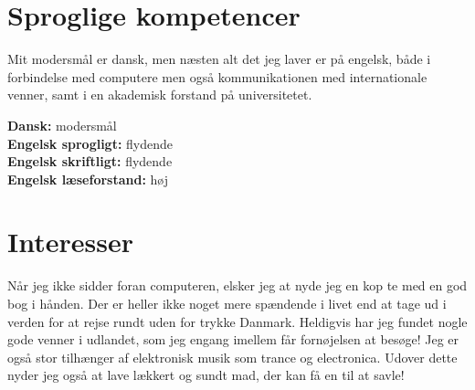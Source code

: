 \documentclass[margin,line,a4paper]{resume}
\begin{document}
\begin{resume}
\begin{description}
\end{description}

\section{\mysidestyle Sproglige kompetencer}
Mit modersmål er dansk, men næsten alt det jeg laver er på engelsk,
både i forbindelse med computere men også kommunikationen med
internationale venner, samt i en akademisk forstand på universitetet.

\textbf{Dansk:} modersmål \\
\textbf{Engelsk sprogligt:} flydende \\
\textbf{Engelsk skriftligt:} flydende \\
\textbf{Engelsk læseforstand:} høj \\

\section{\mysidestyle Interesser}

Når jeg ikke sidder foran computeren, elsker jeg at nyde jeg en kop 
te med en god bog i hånden. Der er heller ikke noget
mere spændende i livet end at tage ud i verden for at rejse rundt uden
for trykke Danmark. Heldigvis har jeg fundet nogle gode venner i udlandet, som jeg engang imellem får fornøjelsen at besøge! Jeg er også stor tilhænger af elektronisk musik som trance og electronica. Udover dette nyder jeg også at lave lækkert og sundt mad, der kan få en til at savle!


\end{resume}
\end{document}
